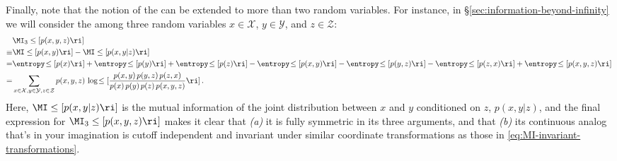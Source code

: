 Finally, note that the notion of the  can be extended to more than two random variables. 
For instance, in \S\ref{sec:information-beyond-infinity} we will consider the  among three random variables $x\in\mathcal{X}$, $y\in\mathcal{Y}$, and $z\in\mathcal{Z}$:
\begin{align}\label{eq:TI-definition}
&\MI_{3}\le[p(x,y,z)\ri]\, \\
\equiv&\MI\le[p(x, y)\ri]-\MI\le[p(x, y| z)\ri] \, \notag\\
= & \entropy\!\le[p(x)\ri]+  \entropy\!\le[p(y)\ri] + \entropy\!\le[p(z)\ri] -  \entropy\!\le[p(x,y)\ri]-  \entropy\!\le[p(y,z)\ri]  -   \entropy\!\le[p(z,x)\ri] +   \entropy\!\le[p(x,y,z)\ri]\, \notag\\
=&\sum_{x \in \mathcal{X}, y \in \mathcal{Y}, z\in\mathcal{Z}} p(x,y,z)\, \log \!\le[ \frac{p(x,y) \, p(y,z)\, p(z,x)}{p(x)\, p(y)\, p(z)\, p(x,y,z)} \ri] \, .\notag
\end{align}
Here, $\MI\le[p(x, y| z)\ri]$ is the mutual information of the joint distribution between $x$ and $y$ conditioned on $z$, $p(x, y| z)$, and the final expression for $\MI_{3}\le[p(x,y,z)\ri]$ makes it clear that \emph{(a)} it is fully symmetric in its three arguments, and that \emph{(b)} its continuous analog that's in your imagination is cutoff independent and invariant under similar coordinate transformations as those in \eqref{eq:MI-invariant-transformations}.


